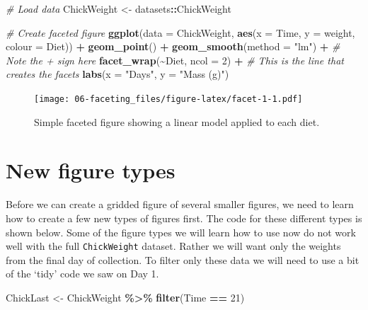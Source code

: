 \documentclass[
]{book}
\newenvironment{Shaded}{\begin{snugshade}}{\end{snugshade}}
\newcommand{\CommentTok}[1]{\textcolor[rgb]{0.56,0.35,0.01}{\textit{#1}}}
\newcommand{\DataTypeTok}[1]{\textcolor[rgb]{0.13,0.29,0.53}{#1}}
\newcommand{\DecValTok}[1]{\textcolor[rgb]{0.00,0.00,0.81}{#1}}
\newcommand{\KeywordTok}[1]{\textcolor[rgb]{0.13,0.29,0.53}{\textbf{#1}}}
\newcommand{\NormalTok}[1]{#1}
\newcommand{\OperatorTok}[1]{\textcolor[rgb]{0.81,0.36,0.00}{\textbf{#1}}}
\newcommand{\StringTok}[1]{\textcolor[rgb]{0.31,0.60,0.02}{#1}}
\begin{document}
\begin{Shaded}
\begin{Highlighting}[]
\CommentTok{\# Load data}
\NormalTok{ChickWeight <{-}}\StringTok{ }\NormalTok{datasets}\OperatorTok{::}\NormalTok{ChickWeight}

\CommentTok{\# Create faceted figure}
\KeywordTok{ggplot}\NormalTok{(}\DataTypeTok{data =}\NormalTok{ ChickWeight, }\KeywordTok{aes}\NormalTok{(}\DataTypeTok{x =}\NormalTok{ Time, }\DataTypeTok{y =}\NormalTok{ weight, }\DataTypeTok{colour =}\NormalTok{ Diet)) }\OperatorTok{+}
\StringTok{  }\KeywordTok{geom\_point}\NormalTok{() }\OperatorTok{+}
\StringTok{  }\KeywordTok{geom\_smooth}\NormalTok{(}\DataTypeTok{method =} \StringTok{"lm"}\NormalTok{) }\OperatorTok{+}\StringTok{ }\CommentTok{\# Note the \textasciigrave{}+\textasciigrave{} sign here}
\StringTok{  }\KeywordTok{facet\_wrap}\NormalTok{(}\OperatorTok{\textasciitilde{}}\NormalTok{Diet, }\DataTypeTok{ncol =} \DecValTok{2}\NormalTok{) }\OperatorTok{+}\StringTok{ }\CommentTok{\# This is the line that creates the facets}
\StringTok{  }\KeywordTok{labs}\NormalTok{(}\DataTypeTok{x =} \StringTok{"Days"}\NormalTok{, }\DataTypeTok{y =} \StringTok{"Mass (g)"}\NormalTok{)}
\end{Highlighting}
\end{Shaded}

\begin{figure}
\centering
\texttt{[image: 06-faceting\_files/figure-latex/facet-1-1.pdf]}
\caption{\label{fig:facet-1}Simple faceted figure showing a linear model applied to each diet.}
\end{figure}

\hypertarget{new-figure-types}{%
\section{New figure types}\label{new-figure-types}}

Before we can create a gridded figure of several smaller figures, we need to learn how to create a few new types of figures first. The code for these different types is shown below. Some of the figure types we will learn how to use now do not work well with the full \texttt{ChickWeight} dataset. Rather we will want only the weights from the final day of collection. To filter only these data we will need to use a bit of the `tidy' code we saw on Day 1.

\begin{Shaded}
\begin{Highlighting}[]
\NormalTok{ChickLast <{-}}\StringTok{ }\NormalTok{ChickWeight }\OperatorTok{\%>\%}\StringTok{ }
\StringTok{  }\KeywordTok{filter}\NormalTok{(Time }\OperatorTok{==}\StringTok{ }\DecValTok{21}\NormalTok{)}
\end{Highlighting}
\end{Shaded}
\end{document}
